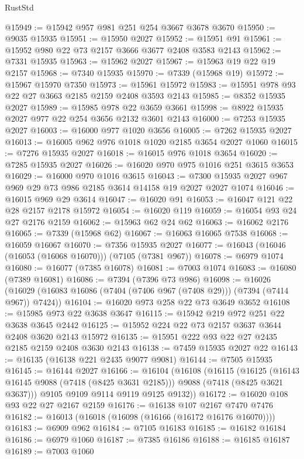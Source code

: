 \begin{lexlean}{RustStd}
\begin{coremodule}
@15949 := @15942 @957 @981 @251 @254 @3667 @3678 @3670
@15950 := @9035 @15935
@15951 := @15950 @2027
@15952 := @15951 @91
@15961 := @15952 @980 @22 @73 @2157 @3666 @3677 @2408 @3583 @2143
@15962 := @7331 @15935
@15963 := @15962 @2027
@15967 := @15963 @19 @22 @19 @2157
@15968 := @7340 @15935
@15970 := @7339 (@15968 @19)
@15972 := @15967 @15970 @7350
@15973 := @15961 @15972
@15983 := @15951 @978 @93 @22 @27 @3663 @2185 @2159 @2408 @3593 @2143
@15985 := @8352 @15935 @2027
@15989 := @15985 @978 @22 @3659 @3661
@15998 := @8922 @15935 @2027 @977 @22 @254 @3656 @2132 @3601 @2143
@16000 := @7253 @15935 @2027
@16003 := @16000 @977 @1020 @3656
@16005 := @7262 @15935 @2027
@16013 := @16005 @962 @976 @1018 @1020 @2185 @3654 @2027 @1060
@16015 := @7276 @15935 @2027
@16018 := @16015 @976 @1018 @3654
@16020 := @7285 @15935 @2027
@16026 := @16020 @970 @975 @1016 @251 @3615 @3653
@16029 := @16000 @970 @1016 @3615
@16043 := @7300 @15935 @2027 @967 @969 @29 @73 @986 @2185 @3614 @14158 @19 @2027 @2027 @1074
@16046 := @16015 @969 @29 @3614
@16047 := @16020 @91
@16053 := @16047 @121 @22 @28 @2157 @2178 @15972
@16054 := @16020 @119
@16059 := @16054 @93 @24 @27 @2176 @2159
@16062 := @15963 @62 @24 @62
@16063 := @16062 @2176
@16065 := @7339 (@15968 @62)
@16067 := @16063 @16065 @7538
@16068 := @16059 @16067
@16070 := @7356 @15935 @2027
@16077 := @16043 (@16046 (@16053 (@16068 @16070))) (@7105 (@7381 @967))
@16078 := @6979 @1074
@16080 := @16077 (@7385 @16078)
@16081 := @7003 @1074
@16083 := @16080 (@7389 @16081)
@16086 := @7394 (@7396 @73 @986)
@16098 := @16026
    (@16029 (@16083 @16086 (@7404 (@7406 @967 (@7408 @29))) (@7394 (@7414 @967)) @7424))
@16104 := @16020 @973 @258 @22 @73 @3649 @3652
@16108 := @15985 @973 @22 @3638 @3647
@16115 := @15942 @219 @972 @251 @22 @3638 @3645 @2442
@16125 := @15952 @224 @22 @73 @2157 @3637 @3644 @2408 @3620 @2143 @15972
@16135 := @15951 @222 @93 @22 @27 @2435 @2185 @2159 @2408 @3630 @2143
@16138 := @7459 @15935 @2027 @22
@16143 := @16135 (@16138 @221 @2435 @9077 @9081)
@16144 := @7505 @15935
@16145 := @16144 @2027
@16166 := @16104
    (@16108
      (@16115
        (@16125 (@16143 @16145 @9088 (@7418 (@8425 @3631 @2185))) @9088 (@7418 (@8425 @3621 @3637)))
        @9105
        @9109
        @9114
        @9119
        @9125
        @9132))
@16172 := @16020 @108 @93 @22 @27 @2167 @2159
@16176 := @16138 @107 @2167 @7470 @7476
@16182 := @16013 (@16018 (@16098 (@16166 (@16172 @16176 @16070))))
@16183 := @6909 @962
@16184 := @7105 @16183
@16185 := @16182 @16184
@16186 := @6979 @1060
@16187 := @7385 @16186
@16188 := @16185 @16187
@16189 := @7003 @1060

\end{coremodule}
\end{lexlean}
